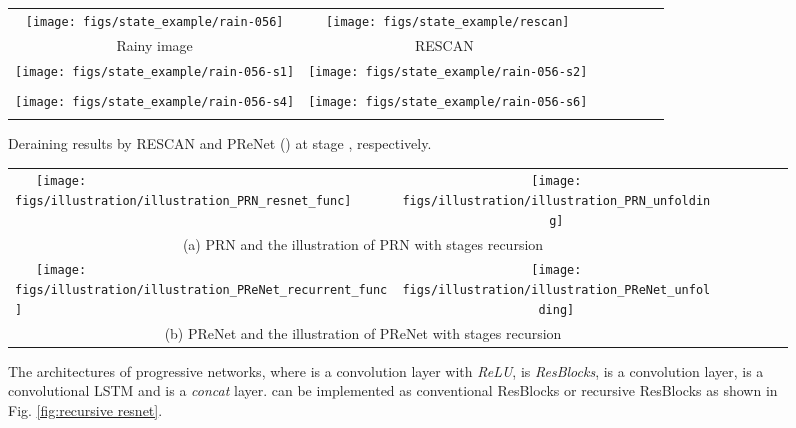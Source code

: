 \documentclass[10pt,twocolumn,letterpaper]{article}
\begin{document}
\begin{figure}[!tb]\footnotesize
\centering
\setlength{\tabcolsep}{1pt}
\begin{tabular}{ccccccc}
\!\!\!\!\!
 \texttt{[image: figs/state\_example/rain-056]} &
 \texttt{[image: figs/state\_example/rescan]} \\
 Rainy image & RESCAN~\cite{li2018recurrent} \\
 \!\!\!\!\!
 \texttt{[image: figs/state\_example/rain-056-s1]} &
 \texttt{[image: figs/state\_example/rain-056-s2]}\\
   & \\
  \!\!\!\!\!
 \texttt{[image: figs/state\_example/rain-056-s4]} &
 \texttt{[image: figs/state\_example/rain-056-s6]} \\
   &   \\
\end{tabular}
   \caption{Deraining results by RESCAN \cite{li2018recurrent} and PReNet () at stage , respectively. }
\label{fig:states results}
\end{figure}
\begin{figure*}[!ht]\footnotesize
	\centering
\begin{tabular}{lcccccc}
		\ \ \
		\texttt{[image: figs/illustration/illustration\_PRN\_resnet\_func]} \ \ \ &
		\texttt{[image: figs/illustration/illustration\_PRN\_unfolding]}\\
		\multicolumn{2}{c}{(a) PRN and the illustration of PRN with  stages recursion}\\
		\ \ \
		\texttt{[image: figs/illustration/illustration\_PReNet\_recurrent\_func]} \ \ \ &
		\texttt{[image: figs/illustration/illustration\_PReNet\_unfolding]}\\
		\multicolumn{2}{c}{(b) PReNet and the illustration of PReNet with  stages recursion}\\
	\end{tabular}
	\caption{The architectures of progressive networks, where  is a convolution layer with \emph{ReLU},  is \emph{ResBlocks},  is a convolution layer,  is a convolutional LSTM and  is a \emph{concat} layer.  can be implemented as conventional ResBlocks or recursive ResBlocks as shown in Fig. \ref{fig:recursive resnet}. }
	\label{fig:network}
\end{figure*}
\end{document}

